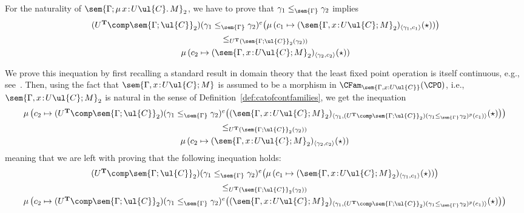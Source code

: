 For the naturality of $\sem{\Gamma; \mu\, x \!:\! U\ul{C} .\, M}_2$, we have to prove that $\gamma_1 \leq_{\sem{\Gamma}} \gamma_2$ implies
\[
\begin{array}{c}
(U^{\mathbf{T}} \comp \sem{\Gamma;\ul{C}}_2)(\gamma_1 \leq_{\sem{\Gamma}} \gamma_2)^e\big(\mu\, (c_1 \mapsto (\sem{\Gamma, x \!:\! U\ul{C};M}_2)_{\langle \gamma_1 , c_1 \rangle}(\star) )\big)
\\[1.5mm]
\leq_{U^{\mathbf{T}}(\sem{\Gamma;\ul{C}}_2(\gamma_2))}
\\[1.5mm]
\mu\, (c_2 \mapsto (\sem{\Gamma, x \!:\! U\ul{C};M}_2)_{\langle \gamma_2 , c_2 \rangle}(\star))
\end{array}
\]

We prove this inequation by first recalling a standard result in domain theory that the least fixed point operation is itself continuous, e.g., see~\cite[Section~2]{Plotkin:PisaNotes}. Then, using the fact that $\sem{\Gamma, x \!:\! U\ul{C};M}$ is assumed to be a morphism in $\CFam_{\sem{\Gamma, x : U\ul{C}}}(\CPO)$, i.e., \linebreak $\sem{\Gamma, x \!:\! U\ul{C};M}_2$ is natural in the sense of Definition~\ref{def:catofcontfamilies}, we get the inequation
\[
\hspace{-0.05cm}
\begin{array}{c}
\mu\, \big(c_2 \mapsto (U^{\mathbf{T}} \comp \sem{\Gamma;\ul{C}}_2)(\gamma_1 \leq_{\sem{\Gamma}} \gamma_2)^e\big((\sem{\Gamma, x \!:\! U\ul{C};M}_2)_{\langle \gamma_1 , (U^{\mathbf{T}} \comp \sem{\Gamma;\ul{C}}_2)(\gamma_1 \leq_{\sem{\Gamma}} \gamma_2)^p(c_1) \rangle}(\star)\big)\big)
\\[1.5mm]
\leq_{U^{\mathbf{T}}(\sem{\Gamma;\ul{C}}_2(\gamma_2))}
\\[1.5mm]
\mu\, (c_2 \mapsto (\sem{\Gamma, x \!:\! U\ul{C};M}_2)_{\langle \gamma_2 , c_2 \rangle}(\star))
\end{array}
\]
meaning that we are left with proving that the following inequation holds:
\[
\hspace{-0.05cm}
\begin{array}{c}
(U^{\mathbf{T}} \comp \sem{\Gamma;\ul{C}}_2)(\gamma_1 \leq_{\sem{\Gamma}} \gamma_2)^e\big(\mu\, (c_1 \mapsto (\sem{\Gamma, x \!:\! U\ul{C};M}_2)_{\langle \gamma_1 , c_1 \rangle}(\star) )\big)
\\[1.5mm]
\leq_{U^{\mathbf{T}}(\sem{\Gamma;\ul{C}}_2(\gamma_2))}
\\[1.5mm]
\mu\, \big(c_2 \mapsto (U^{\mathbf{T}} \comp \sem{\Gamma;\ul{C}}_2)(\gamma_1 \leq_{\sem{\Gamma}} \gamma_2)^e\big((\sem{\Gamma, x \!:\! U\ul{C};M}_2)_{\langle \gamma_1 , (U^{\mathbf{T}} \comp \sem{\Gamma;\ul{C}}_2)(\gamma_1 \leq_{\sem{\Gamma}} \gamma_2)^p(c_1) \rangle}(\star)\big)\big)
\end{array}
\]

